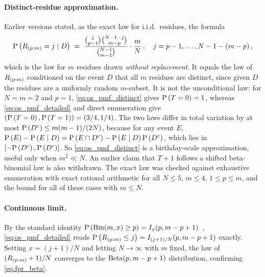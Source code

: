 \paragraph{Distinct-residue approximation.}
Earlier versions stated, as the exact law for i.i.d.\ residues, the formula
\begin{equation}
\label{eq:os_pmf_distinct}
    \Prob{\OS{p}{m} = j \mid D}
    \;=\; \frac{\binom{j}{p-1}\binom{N-1-j}{m-p}}{\binom{N-1}{m-1}}
    \cdot \frac{m}{N}\,,
    \quad j = p-1, \ldots, N-1-(m-p)\,,
\end{equation}
which is the law for $m$ residues drawn \emph{without replacement}.
It equals the law of $R_{(p:m)}$ conditioned on the event $D$ that all $m$
residues are distinct, since given $D$ the residues are a uniformly random
$m$-subset.
It is not the unconditional law: for $N = m = 2$ and $p = 1$,
\cref{eq:os_pmf_distinct} gives $\Prob{T = 0} = 1$, whereas
\cref{eq:os_pmf_detailed} and direct enumeration give
$(\Prob{T=0}, \Prob{T=1}) = (3/4, 1/4)$.
The two laws differ in total variation by at most
$\Prob{D^c} \leq m(m-1)/(2N)$, because for any event $E$,
$\Prob{E} - \Prob{E \mid D} = \Prob{E \cap D^c} - \Prob{E \mid D}\Prob{D^c}$,
which lies in $[-\Prob{D^c}, \Prob{D^c}]$.
So \cref{eq:os_pmf_distinct} is a birthday-scale approximation, useful only
when $m^2 \ll N$.
An earlier claim that $T+1$ follows a shifted beta-binomial law is also
withdrawn.
The exact law was checked against exhaustive enumeration with exact rational
arithmetic for all $N \leq 5$, $m \leq 4$, $1 \leq p \leq m$, and the bound for
all of these cases with $m \leq N$.

\paragraph{Continuous limit.}
By the standard identity
$\Prob{\bindist(m, x) \geq p} = I_x(p, m - p + 1)$~\cite{order_statistics},
\cref{eq:os_pmf_detailed} reads $\Prob{\OS{p}{m} \leq j} = I_{(j+1)/N}(p, m-p+1)$
exactly.
Setting $x = (j+1)/N$ and letting $N \to \infty$ with $m$ fixed, the law of
$(R_{(p:m)}+1)/N$ converges to the $\operatorname{Beta}(p, m - p + 1)$ distribution,
confirming \cref{eq:fpr_beta}.
